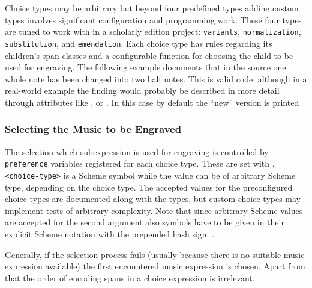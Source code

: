 \documentclass[]{ollmanual}
\newenvironment{Shaded}{}{}
\begin{document}
Choice types may be arbitrary but beyond four predefined types adding
custom types involves significant configuration and programming work.
These four types are tuned to work with  in a
scholarly edition project: \texttt{variants}, \texttt{normalization},
\texttt{substitution}, and \texttt{emendation}. Each choice type has
rules regarding its children's span classes and a configurable function
for choosing the child to be used for engraving. The following example
documents that in the source one whole note has been changed into two
half notes. This is valid code, although in a real-world example the
finding would probably be described in more detail through attributes
like ,  or . In
this case by default the ``new'' version is printed

\begin{Shaded}
\begin{Highlighting}[]

\end{Highlighting}
\end{Shaded}


\hypertarget{selecting-the-music-to-be-engraved}{%
\subsubsection{Selecting the Music to be
Engraved}\label{selecting-the-music-to-be-engraved}}

The selection which subexpression is used for engraving is controlled by
\texttt{preference} variables registered for each choice type. These are
set with .
\texttt{\textless{}choice-type\textgreater{}} is a Scheme symbol while
the value can be of arbitrary Scheme type, depending on the choice type.
The accepted values for the preconfigured choice types are documented
along with the types, but custom choice types may implement tests of
arbitrary complexity. Note that since arbitrary Scheme values are
accepted for the second argument also symbols have to be given in their
explicit Scheme notation with the prepended hash sign:
.

Generally, if the selection process fails (usually because there is no
suitable music expression available) the first encountered music
expression is chosen. Apart from that the order of encoding spans in a
choice expression is irrelevant.
\end{document}

